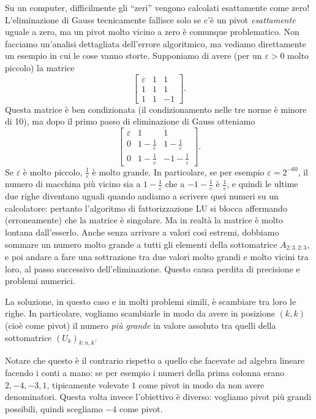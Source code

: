 \documentclass[a4paper]{report}
\theoremstyle{definiton}
\theoremstyle{remark}
\begin{document}
Su un computer, difficilmente gli ``zeri'' vengono calcolati esattamente come zero! L'eliminazione di Gauss tecnicamente fallisce solo se c'è un pivot \emph{esattamente} uguale a zero, ma un pivot molto vicino a zero è comunque problematico. Non facciamo un'analisi dettagliata dell'errore algoritmico, ma vediamo direttamente un esempio in cui le cose vanno storte. Supponiamo di avere (per un $\varepsilon>0$ molto piccolo) la matrice
\[
\begin{bmatrix}
    \varepsilon & 1 & 1\\
    1 & 1 & 1\\
    1 & 1 & -1
\end{bmatrix}.
\]
Questa matrice è ben condizionata (il condizionamento nelle tre norme è minore di 10), ma dopo il primo passo di eliminazione di Gauss otteniamo
\[
\begin{bmatrix}
    \varepsilon & 1 & 1\\
    0 & 1-\frac{1}{\varepsilon} & 1-\frac{1}{\varepsilon}\\
    0 & 1-\frac{1}{\varepsilon} & -1-\frac{1}{\varepsilon}
\end{bmatrix}.
\]
Se $\varepsilon$ è molto piccolo, $\frac{1}{\varepsilon}$ è molto grande. In particolare, se per esempio $\varepsilon = 2^{-60}$, il numero di macchina più vicino sia a $1-\frac{1}{\varepsilon}$ che a $-1-\frac{1}{\varepsilon}$ è $\frac{1}{\varepsilon}$, e quindi le ultime due righe diventano uguali quando andiamo a scrivere quei numeri su un calcolatore: pertanto l'algoritmo di fattorizzazione LU si blocca affermando (erroneamente) che la matrice è singolare. Ma in realtà la matrice è molto lontana dall'esserlo. Anche senza arrivare a valori così estremi, dobbiamo sommare un numero molto grande a tutti gli elementi della sottomatrice $A_{2:3,2:3}$, e poi andare a fare una sottrazione tra due valori molto grandi e molto vicini tra loro, al passo successivo dell'eliminazione. Questo causa perdita di precisione e problemi numerici.

La soluzione, in questo caso e in molti problemi simili, è scambiare tra loro le righe. In particolare, vogliamo scambiarle in modo da avere in posizione $(k,k)$ (cioè come pivot) il numero \emph{più grande} in valore assoluto tra quelli della sottomatrice $(U_k)_{k:n,k}$.

Notare che questo è il contrario rispetto a quello che facevate ad algebra lineare facendo i conti a mano: se per esempio i numeri della prima colonna erano $2,-4,-3,1$, tipicamente volevate $1$ come pivot in modo da non avere denominatori. Questa volta invece l'obiettivo è diverso: vogliamo pivot più grandi possibili, quindi scegliamo $-4$ come pivot.
\end{document}

